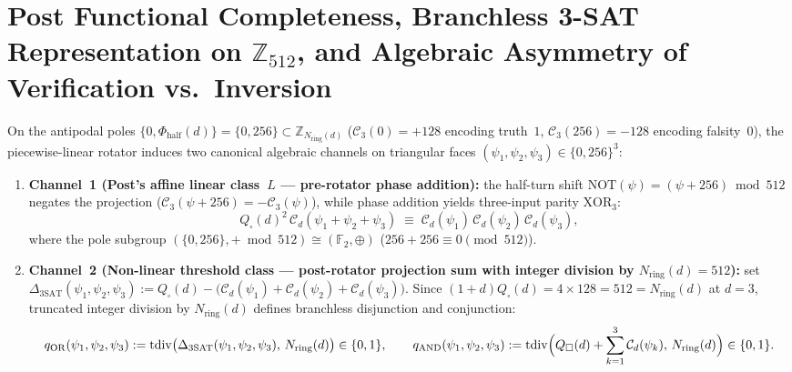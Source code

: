 \documentclass[11pt,a4paper]{article}
\theoremstyle{plain}
\theoremstyle{definition}
\begin{document}
\section{Post Functional Completeness, Branchless 3-SAT Representation on \texorpdfstring{$\mathbb{Z}_{512}$}{Z512}, and Algebraic Asymmetry of Verification vs.\ Inversion}
\label{sec:boolean-3sat}

On the antipodal poles $\{0,\Phi_{\mathrm{half}}(d)\}=\{0,256\}\subset\mathbb{Z}_{N_{\mathrm{ring}}(d)}$ ($\mathcal{C}_3(0)=+128$ encoding truth~$1$, $\mathcal{C}_3(256)=-128$ encoding falsity~$0$), the piecewise-linear rotator induces two canonical algebraic channels on triangular faces $(\psi_1,\psi_2,\psi_3)\in\{0,256\}^3$:
\begin{enumerate}[leftmargin=*,noitemsep]
\item \textbf{Channel~1 (Post's affine linear class~$L$ --- pre-rotator phase addition):}
  the half-turn shift $\mathrm{NOT}(\psi)=(\psi+256)\bmod 512$ negates the projection ($\mathcal{C}_3(\psi+256)=-\mathcal{C}_3(\psi)$), while phase addition yields three-input parity $\mathrm{XOR}_3$:
  \begin{equation}
    \label{eq:pre-rotator-xor}
    Q_\square(d)^2\,\mathcal{C}_d(\psi_1+\psi_2+\psi_3) \;\equiv\; \mathcal{C}_d(\psi_1)\,\mathcal{C}_d(\psi_2)\,\mathcal{C}_d(\psi_3),
  \end{equation}
  where the pole subgroup $(\{0,256\},+\bmod 512)\cong(\mathbb{F}_2,\oplus)$ ($256+256\equiv 0\pmod{512}$).
\item \textbf{Channel~2 (Non-linear threshold class --- post-rotator projection sum with integer division by $N_{\mathrm{ring}}(d)=512$):}
  set $\Delta_{\mathrm{3SAT}}(\psi_1,\psi_2,\psi_3) := Q_\square(d)-\bigl(\mathcal{C}_d(\psi_1)+\mathcal{C}_d(\psi_2)+\mathcal{C}_d(\psi_3)\bigr)$. Since $(1+d)Q_\square(d)=4\times 128=512=N_{\mathrm{ring}}(d)$ at $d=3$, truncated integer division by $N_{\mathrm{ring}}(d)$ defines branchless disjunction and conjunction:
  \begin{equation}
    \label{eq:post-rotator-or-and}
    q_{\mathrm{OR}}(\psi_1,\psi_2,\psi_3) := \mathrm{tdiv}\bigl(\Delta_{\mathrm{3SAT}}(\psi_1,\psi_2,\psi_3),\,N_{\mathrm{ring}}(d)\bigr)\in\{0,1\},\qquad
    q_{\mathrm{AND}}(\psi_1,\psi_2,\psi_3) := \mathrm{tdiv}\Bigl(Q_\square(d)+\sum_{k=1}^3\mathcal{C}_d(\psi_k),\,N_{\mathrm{ring}}(d)\Bigr)\in\{0,1\}.
  \end{equation}
\end{enumerate}
\end{document}
